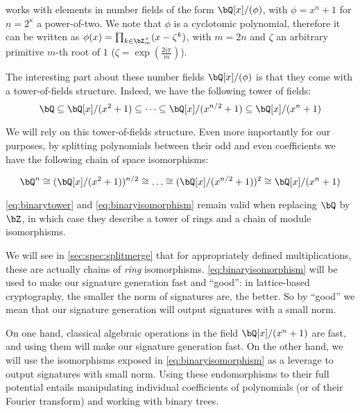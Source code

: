\falcon works with elements in number fields of the form $\bQ[x]/(\phi)$, with $\phi = x^n+1$ for $n = 2^\kappa$ a power-of-two. We note that $\phi$ is a cyclotomic polynomial, therefore it can be written as $\phi(x) = \prod_{k \in \bZ_{m}^\times} (x - \zeta^k)$, with $m = 2n$ and $\zeta$ an arbitrary primitive $m$-th root of $1$ (\eg $\zeta = \exp(\frac{2i\pi}{m})$).

The interesting part about these number fields $\bQ[x]/(\phi)$ is that they come with a tower-of-fields structure. Indeed, we have the following tower of fields:
\begin{equation}\label{eq:binarytower}
\bQ \subseteq \bQ[x]/(x^{2} + 1) \subseteq \dots \subseteq \bQ[x]/(x^{n/2} + 1) \subseteq \bQ[x]/(x^{n} + 1)
\end{equation}

We will rely on this tower-of-fields structure. Even more importantly for our purposes, by splitting polynomials between their odd and even coefficients we have the following chain of space isomorphisms:

\begin{equation}\label{eq:binaryisomorphism}
\bQ^n \cong (\bQ[x]/(x^{2} + 1))^{n/2} \cong \dots \cong (\bQ[x]/(x^{n/2} + 1))^2 \cong \bQ[x]/(x^{n} + 1)
\end{equation}


\eqref{eq:binarytower} and \eqref{eq:binaryisomorphism} remain valid when replacing $\bQ$ by $\bZ$, in which case they describe a tower of rings and a chain of module isomorphisms.

We will see in \cref{sec:spec:splitmerge} that for appropriately defined multiplications, these are actually chains of \emph{ring} isomorphisms. \eqref{eq:binaryisomorphism} will be used to make our signature generation fast and ``good'': in lattice-based cryptography, the smaller the norm of signatures are, the better. So by ``good'' we mean that our signature generation will output signatures with a small norm.

On one hand, classical algebraic operations in the field $\bQ[x]/(x^{n} + 1)$ are fast, and using them will make our signature generation fast. On the other hand, we will use the isomorphisms exposed in \eqref{eq:binaryisomorphism} as a leverage to output signatures with small norm. Using these endomorphisms to their full potential entails manipulating individual coefficients of polynomials (or of their Fourier transform) and working with binary trees.
